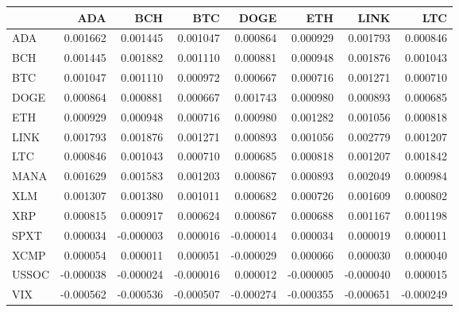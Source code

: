 \begin{tabular}{lrrrrrrr}
\toprule
 & ADA & BCH & BTC & DOGE & ETH & LINK & LTC \\
\midrule
ADA & 0.001662 & 0.001445 & 0.001047 & 0.000864 & 0.000929 & 0.001793 & 0.000846 \\
BCH & 0.001445 & 0.001882 & 0.001110 & 0.000881 & 0.000948 & 0.001876 & 0.001043 \\
BTC & 0.001047 & 0.001110 & 0.000972 & 0.000667 & 0.000716 & 0.001271 & 0.000710 \\
DOGE & 0.000864 & 0.000881 & 0.000667 & 0.001743 & 0.000980 & 0.000893 & 0.000685 \\
ETH & 0.000929 & 0.000948 & 0.000716 & 0.000980 & 0.001282 & 0.001056 & 0.000818 \\
LINK & 0.001793 & 0.001876 & 0.001271 & 0.000893 & 0.001056 & 0.002779 & 0.001207 \\
LTC & 0.000846 & 0.001043 & 0.000710 & 0.000685 & 0.000818 & 0.001207 & 0.001842 \\
MANA & 0.001629 & 0.001583 & 0.001203 & 0.000867 & 0.000893 & 0.002049 & 0.000984 \\
XLM & 0.001307 & 0.001380 & 0.001011 & 0.000682 & 0.000726 & 0.001609 & 0.000802 \\
XRP & 0.000815 & 0.000917 & 0.000624 & 0.000867 & 0.000688 & 0.001167 & 0.001198 \\
SPXT & 0.000034 & -0.000003 & 0.000016 & -0.000014 & 0.000034 & 0.000019 & 0.000011 \\
XCMP & 0.000054 & 0.000011 & 0.000051 & -0.000029 & 0.000066 & 0.000030 & 0.000040 \\
USSOC & -0.000038 & -0.000024 & -0.000016 & 0.000012 & -0.000005 & -0.000040 & 0.000015 \\
VIX & -0.000562 & -0.000536 & -0.000507 & -0.000274 & -0.000355 & -0.000651 & -0.000249 \\
\bottomrule
\end{tabular}
